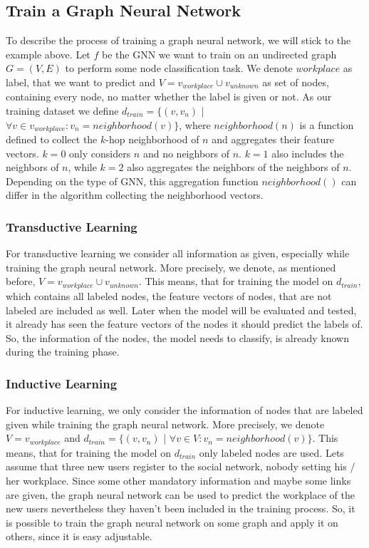     \subsection*{Train a Graph Neural Network}

      To describe the process of training a graph neural network, we will stick to the example above.
      Let $f$ be the GNN we want to train on an undirected graph $G = (V,E)$ to perform some node classification task.
      We denote $workplace$ as label, that we want to predict and $V = v_{workplace} \cup v_{unknown}$ as set of nodes, containing every node, no matter whether the label is given or not.
      As our training dataset we define $d_{train} = \{(v, v_n)$ | $ \forall v \in v_{workplace}: v_n = neighborhood(v)\}$, where $neighborhood(n)$ is a function defined to collect the $k$-hop neighborhood of $n$ and aggregates their feature vectors. 
      $k = 0$ only considers $n$ and no neighbors of $n$.
      $k = 1$ also includes the neighbors of $n$, while $k = 2$ also aggregates the neighbors of the neighbors of $n$. 
      Depending on the type of GNN, this aggregation function $neighborhood()$ can differ in the algorithm collecting the neighborhood vectors.

      \subsubsection*{Transductive Learning}

        For transductive learning we consider all information as given, especially while training the graph neural network.
        More precisely, we denote, as mentioned before, $V = v_{workplace} \cup v_{unknown}$.
        This means, that for training the model on $d_{train}$, which contains all labeled nodes, the feature vectors of nodes, that are not labeled are included as well.
        Later when the model will be evaluated and tested, it already has seen the feature vectors of the nodes it should predict the labels of.
        So, the information of the nodes, the model needs to classify, is already known during the training phase.

      \subsubsection*{Inductive Learning}

        For inductive learning, we only consider the information of nodes that are labeled given while training the graph neural network.
        More precisely, we denote $V = v_{workplace}$ and $d_{train} = \{(v, v_n)$ | $ \forall v \in V: v_n = neighborhood(v)\}$.
        This means, that for training the model on $d_{train}$ only labeled nodes are used.
        Lets assume that three new users register to the social network, nobody setting his / her workplace.
        Since some other mandatory information and maybe some links are given, the graph neural network can be used to predict the workplace of the new users nevertheless they haven't been included in the training process.
        So, it is possible to train the graph neural network on some graph and apply it on others, since it is easy adjustable.
        
